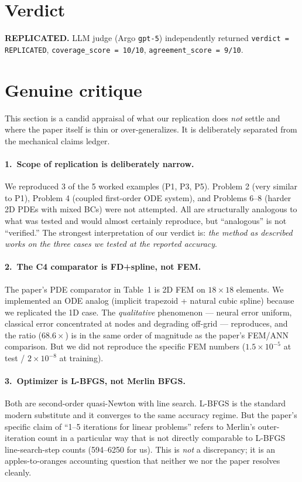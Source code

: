 \documentclass[11pt]{article}
\begin{document}
\section{Verdict}
\textbf{REPLICATED.} LLM judge (Argo \texttt{gpt-5}) independently returned
\texttt{verdict = REPLICATED}, \texttt{coverage\_score = 10/10},
\texttt{agreement\_score = 9/10}.

\section{Genuine critique}
This section is a candid appraisal of what our replication does \emph{not}
settle and where the paper itself is thin or over-generalizes. It is
deliberately separated from the mechanical claims ledger.

\paragraph{1.\ Scope of replication is deliberately narrow.}
We reproduced 3 of the 5 worked examples (P1, P3, P5). Problem 2 (very similar
to P1), Problem 4 (coupled first-order ODE system), and Problems 6--8 (harder
2D PDEs with mixed BCs) were not attempted. All are structurally analogous to
what was tested and would almost certainly reproduce, but ``analogous'' is not
``verified.'' The strongest interpretation of our verdict is: \emph{the method
as described works on the three cases we tested at the reported accuracy}.

\paragraph{2.\ The C4 comparator is FD+spline, not FEM.}
The paper's PDE comparator in Table~1 is 2D FEM on $18\times 18$ elements. We
implemented an ODE analog (implicit trapezoid + natural cubic spline) because
we replicated the 1D case. The \emph{qualitative} phenomenon --- neural error
uniform, classical error concentrated at nodes and degrading off-grid ---
reproduces, and the ratio ($68.6\times$) is in the same order of magnitude as
the paper's FEM/ANN comparison. But we did not reproduce the specific FEM
numbers ($1.5\times 10^{-5}$ at test / $2\times 10^{-8}$ at training).

\paragraph{3.\ Optimizer is L-BFGS, not Merlin BFGS.}
Both are second-order quasi-Newton with line search. L-BFGS is the standard
modern substitute and it converges to the same accuracy regime. But the
paper's specific claim of ``1--5 iterations for linear problems'' refers to
Merlin's outer-iteration count in a particular way that is not directly
comparable to L-BFGS line-search-step counts (594--6250 for us). This is
\emph{not} a discrepancy; it is an apples-to-oranges accounting question that
neither we nor the paper resolves cleanly.
\end{document}
